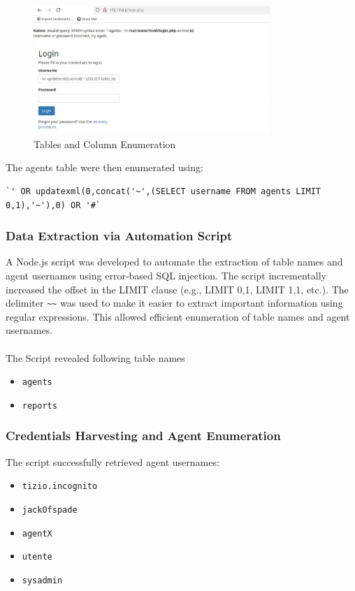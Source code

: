 \documentclass[12pt]{article}
\begin{document}
\begin{figure}[h!]
\centering
\includegraphics[width=0.8\textwidth]{PT5.png}
\caption{Tables and Column Enumeration}
\label{fig:sql_injection}
\end{figure}

\FloatBarrier

The agents table were then enumerated using:

\begin{verbatim}
`' OR updatexml(0,concat('~',(SELECT username FROM agents LIMIT 0,1),'~'),0) OR '#`
\end{verbatim}

\subsubsection{Data Extraction via Automation Script}
A Node.js script was developed to automate the extraction of table names and agent usernames using error-based SQL injection. The script incrementally increased the offset in the LIMIT clause (e.g., LIMIT 0,1, LIMIT 1,1, etc.). The delimiter \verb|~~| was used to make it easier to extract important information using regular expressions. This allowed efficient enumeration of table names and agent usernames. 
\\ \\
The Script revealed following table names
\begin{itemize}
    \item \texttt{agents}
    \item \texttt{reports}
\end{itemize}

\subsubsection{Credentials Harvesting and Agent Enumeration}
The script successfully retrieved agent usernames:
\begin{itemize}
    \item \texttt{tizio.incognito}
    \item \texttt{jackOfspade}
    \item \texttt{agentX}
    \item \texttt{utente}
    \item \texttt{sysadmin}
\end{itemize}
\end{document}
